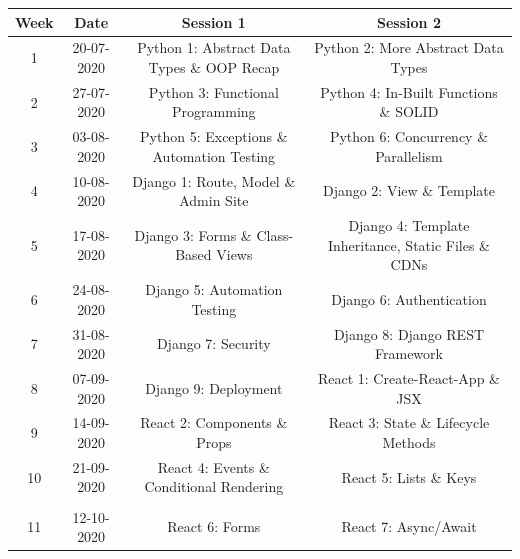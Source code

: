 \documentclass{article}
\begin{document}
\renewcommand{\arraystretch}{1.5}
\begin{tabular}{|c|c|c|c|}
	\hline
	\textbf{Week} & \textbf{Date}     & \textbf{Session 1}                                     & \textbf{Session 2}                                          \\ \hline
	\small 1      & \small 20-07-2020 & \small Python 1: Abstract Data Types \& OOP Recap      & \small Python 2: More Abstract Data Types                   \\ \hline
	\small 2      & \small 27-07-2020 & \small Python 3: Functional Programming                & \small Python 4: In-Built Functions \& SOLID                \\ \hline
	\small 3      & \small 03-08-2020 & \small Python 5: Exceptions \& Automation Testing      & \small Python 6: Concurrency \& Parallelism                 \\ \hline
	\small 4      & \small 10-08-2020 & \small Django 1: Route, Model \& Admin Site            & \small Django 2: View \& Template                           \\ \hline
	\small 5      & \small 17-08-2020 & \small Django 3: Forms \& Class-Based Views            & \small Django 4: Template Inheritance, Static Files \& CDNs \\ \hline
	\small 6      & \small 24-08-2020 & \small Django 5: Automation Testing                    & \small Django 6: Authentication                             \\ \hline
	\small 7      & \small 31-08-2020 & \small Django 7: Security                              & \small Django 8: Django REST Framework                      \\ \hline
	\small 8      & \small 07-09-2020 & \small Django 9: Deployment                            & \small React 1: Create-React-App \& JSX                     \\ \hline
	\small 9      & \small 14-09-2020 & \small React 2: Components \& Props        & \small React 3: State \& Lifecycle Methods                  \\ \hline
	\small 10     & \small 21-09-2020 & \small React 4: Events \& Conditional Rendering & \small React 5:  Lists \& Keys                              \\ \hline
	\rowcolor{yellow} \multicolumn{4}{|c|}{\small Mid Term Break}                                                             \\ \hline
	\small 11     & \small 12-10-2020 & \small React 6: Forms          & \small React 7: Async/Await       \\ \hline                                           

\end{tabular}
\end{document}
